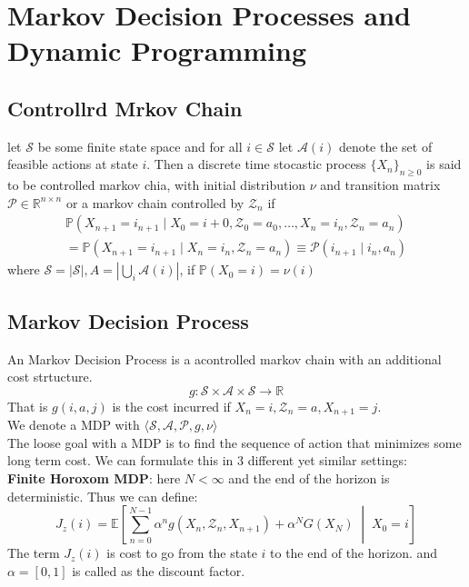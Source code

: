 \section{Markov Decision Processes and Dynamic Programming}

\subsection{Controllrd Mrkov Chain}
let \(\mathcal{S} \) be some finite state space and for all \(i \in \mathcal{S} \) let 
\(\mathcal{A} (i)\) denote the set of feasible actions at state \(i\). Then a discrete time stocastic
process \(\{X_n\}_{n \geq  0}\) is said to be controlled markov chia, with initial distribution \(\nu \) 
and transition matrix \(\mathcal{P} \in \mathbb{R} ^{n\times n}\) or a markov chain controlled by \(\mathcal{Z} _n\)
if
\begin{multline*}
    \mathbb{P} (X_{n+1} = i_{n+1} \mid  X_0 = i+0, \mathcal{Z}_0 = a_0, \dots , X_n = i_n, \mathcal{Z}_n = a_n)\\
    = \mathbb{P} (X_{n+1} = i_{n+1} \mid X_n = i_n, \mathcal{Z}_n = a_n) \equiv \mathcal{P} (i_{n+1} \mid i_n, a_n)
\end{multline*}
where \(\mathcal{S}  = \vert \mathcal{S}  \vert , A = \left\vert \bigcup\limits_i 
\mathcal{A} (i) \right\vert \), if \(\mathbb{P} (X_0 = i) = \nu (i)\) 
\subsection{Markov Decision Process}
An Markov Decision Process is a acontrolled markov chain with an additional cost strtucture.
\[
    g : \mathcal{S} \times \mathcal{A} \times \mathcal{S} \to \mathbb{R}
\]
That is \(g(i,a,j)\) is the cost incurred if \(X_n = i, \mathcal{Z}_n = a, X_{n+1} = j\).\\
We denote a MDP with \(\langle \mathcal{S} ,\mathcal{A} ,\mathcal{P} ,g,\nu  \rangle \) \\
The loose goal with a MDP is to find the sequence of action that minimizes some long term cost. We can
formulate this in 3 different yet similar settings:\\

\textbf{Finite Horoxom MDP}: here \(N<\infty \) and the end of the horizon is deterministic. Thus we
can define:
\[
    J_z(i) = \mathbb{E} \left[
    \sum_{n=0}^{N-1} \alpha ^n g(X_n,\mathcal{Z}_n,X_{n+1}) + \alpha ^N G(X_N) \;\middle|\; X_0 = i
     \right]
\]
The term \(J_z(i)\) is cost to go from the state \(i\) to the end of the horizon. and 
\(\alpha  = [0,1]\) is called as the discount factor.\\

